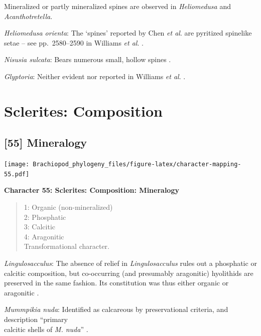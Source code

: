 \documentclass[]{book}
\theoremstyle{definition}
\theoremstyle{definition}
\theoremstyle{definition}
\theoremstyle{remark}
\begin{document}
Mineralized or partly mineralized spines are observed in
\emph{Heliomedusa} and \emph{Acanthotretella}.

\emph{Heliomedusa orienta}: The `spines' reported by Chen \emph{et al}.
\citeyearpar{Chen2007Reinterpretationof} are pyritized spinelike\\
setae -- see pp.~2580--2590 in Williams \emph{et al}.
\citeyearpar{Williams2007PartH}.

\emph{Nisusia sulcata}: Bears numerous small, hollow spines
\citep{Williams2000BrachiopodaLinguliformea}.

\emph{Glyptoria}: Neither evident nor reported in Williams \emph{et al}.
\citeyearpar{Williams2000BrachiopodaLinguliformea}.

\hypertarget{sclerites-composition}{%
\section{Sclerites: Composition}\label{sclerites-composition}}

\hypertarget{mineralogy}{%
\subsection*{{[}55{]} Mineralogy}\label{mineralogy}}

\texttt{[image: Brachiopod\_phylogeny\_files/figure-latex/character-mapping-55.pdf]}

\textbf{Character 55: Sclerites: Composition: Mineralogy}

\begin{quote}
1: Organic (non-mineralized)\\
2: Phosphatic\\
3: Calcitic\\
4: Aragonitic\\
Transformational character.
\end{quote}

\emph{Lingulosacculus}: The absence of relief in \emph{Lingulosacculus}
rules out a phosphatic or calcitic composition, but co-occurring (and
presumably aragonitic) hyolithids are preserved in the same fashion. Its
constitution was thus either organic or aragonitic
\citep{Balthasar2009EarlyCambrian}.

\emph{Mummpikia nuda}: Identified as calcareous by preservational
criteria, and description ``primary\\
calcitic shells of \emph{M. nuda}'' \citep{Balthasar2008iMummpikia}.
\end{document}
